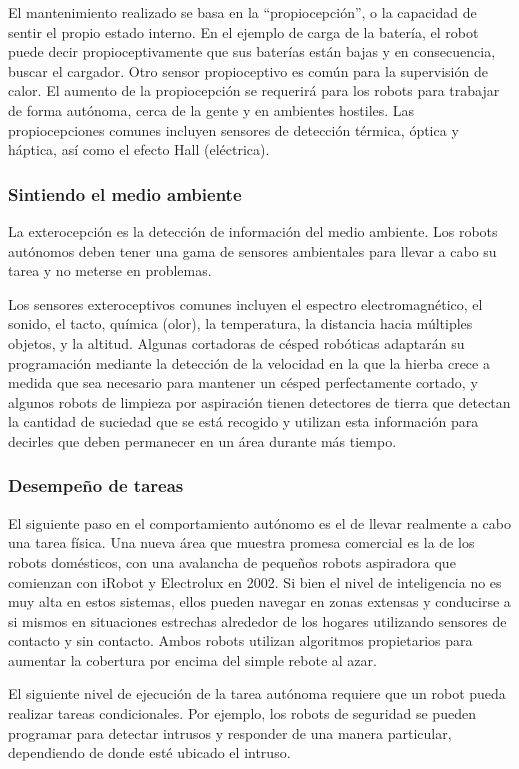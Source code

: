 El mantenimiento realizado se basa en la ``propiocepción'', o la capacidad de sentir el propio estado interno. En el ejemplo de carga de la batería, el robot puede decir propioceptivamente que sus baterías están bajas y en consecuencia, buscar el cargador. Otro sensor propioceptivo es común para la supervisión de calor. El aumento de la propiocepción se requerirá para los robots para trabajar de forma autónoma, cerca de la gente y en ambientes hostiles. Las propiocepciones comunes incluyen sensores de detección térmica, óptica y háptica, así como el efecto Hall (eléctrica).

\subsubsection{Sintiendo el medio ambiente}
La exterocepción es la detección de información del medio ambiente. Los robots autónomos deben tener una gama de sensores ambientales para llevar a cabo su tarea y no meterse en problemas.

Los sensores exteroceptivos comunes incluyen el espectro electromagnético, el sonido, el tacto, química (olor), la temperatura, la distancia hacia múltiples objetos, y la altitud.
Algunas cortadoras de césped robóticas adaptarán su programación mediante la detección de la velocidad en la que la hierba crece a medida que sea necesario para mantener un césped perfectamente cortado, y algunos robots de limpieza por aspiración tienen detectores de tierra que detectan la cantidad de suciedad que se está recogido y utilizan esta información para decirles que deben permanecer en un área durante más tiempo.

\subsubsection{Desempeño de tareas}
El siguiente paso en el comportamiento autónomo es el de llevar realmente a cabo una tarea física. Una nueva área que muestra promesa comercial es la de los robots domésticos, con una avalancha de pequeños robots aspiradora que comienzan con iRobot y Electrolux en 2002. Si bien el nivel de inteligencia no es muy alta en estos sistemas, ellos pueden navegar en zonas extensas y conducirse a si mismos en situaciones estrechas alrededor de los hogares utilizando sensores de contacto y sin contacto. Ambos robots utilizan algoritmos propietarios para aumentar la cobertura por encima del simple rebote al azar.

El siguiente nivel de ejecución de la tarea autónoma requiere que un robot pueda realizar tareas condicionales. Por ejemplo, los robots de seguridad se pueden programar para detectar intrusos y responder de una manera particular, dependiendo de donde esté ubicado el intruso.

